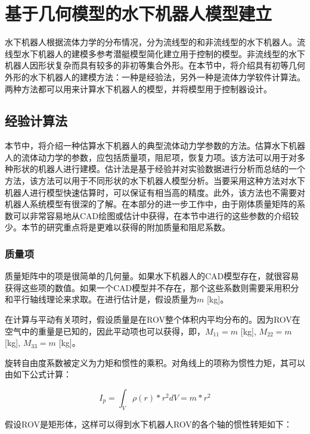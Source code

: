 \section{基于几何模型的水下机器人模型建立  }


水下机器人根据流体力学的分布情况，分为流线型的和非流线型的水下机器人。流线型水下机器人的建模多参考潜艇模型简化建立用于控制的模型。非流线型的水下机器人因形状复杂而具有较多的非初等集合外形。在本节中，将介绍具有初等几何外形的水下机器人的建模方法：一种是经验法，另外一种是流体力学软件计算法\cite{eidsvik2015identification,elgenes2017underwater}。两种方法都可以用来计算水下机器人的模型，并将模型用于控制器设计。

\subsection{经验计算法}

本节中，将介绍一种估算水下机器人的典型流体动力学参数的方法。估算水下机器人的流体动力学的参数，应包括质量项，阻尼项，恢复力项。该方法可以用于对多种形状的机器人进行建模。估计法是基于经验并对实验数据进行分析而总结的一个方法，该方法可以用于不同形状的水下机器人模型分析\cite{bertram2012practical}。当要采用这种方法对水下机器人进行模型快速估算时，可以保证有相当高的精度。此外，该方法也不需要对机器人系统模型有很深的了解。在本部分的进一步工作中，由于刚体质量矩阵的系数可以非常容易地从CAD绘图或估计中获得，在本节中进行的这些参数的介绍较少。本节的研究重点将是更难以获得的附加质量和阻尼系数。

\subsubsection{质量项}
质量矩阵中的项是很简单的几何量。如果水下机器人的CAD模型存在，就很容易获得这些项的数值。如果一个CAD模型并不存在，那个这些系数则需要采用积分和平行轴线理论来求取。在进行估计是，假设质量为$m$ [kg]。

在计算与平动有关项时，假设质量是在ROV整个体积内平均分布的。因为ROV在空气中的重量是已知的，因此平动项也可以获得，即，$M_{11} = m$  [kg], $M_{22} = m$ [kg], $M_{33}=m$ [kg]。

旋转自由度系数被定义为力矩和惯性的乘积。对角线上的项称为惯性力矩，其可以由如下公式计算：

\begin{equation}
I_p =  \int_{V}\rho \left ( r \right )\ast r^{2}dV = m \ast r^{2}
\label{eq:chap4:mass}
\end{equation}

假设ROV是矩形体，这样可以得到水下机器人ROV的各个轴的惯性转矩如下：

